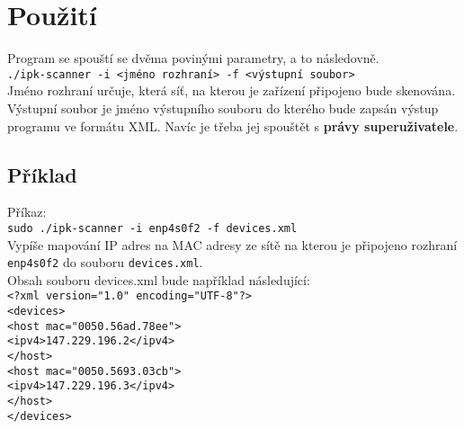 \documentclass[11pt,a4paper,titlepage]{article}
\begin{document}
\section{Použití}
Program se spouští se dvěma povinými parametry, a to následovně.\\
\texttt{./ipk-scanner -i <jméno rozhraní> -f <výstupní soubor>}\\
Jméno rozhraní určuje, která síť, na kterou je zařízení připojeno bude skenována.
Výstupní soubor je jméno výstupního souboru do kterého bude zapsán výstup programu
ve formátu XML.
Navíc je třeba jej spouštět s \textbf{právy superuživatele}.
\subsection{Příklad}
Příkaz: \\
\texttt{sudo ./ipk-scanner -i enp4s0f2 -f devices.xml}\\
Vypíše mapování IP adres na MAC adresy ze sítě na kterou je připojeno 
rozhraní \texttt{enp4s0f2} do souboru \texttt{devices.xml}.\\
Obsah souboru devices.xml bude například následující:\\
\texttt{<?xml version="1.0" encoding="UTF-8"?>}\\
\texttt{<devices>}\\
\texttt{<host mac="0050.56ad.78ee">}\\
\texttt{<ipv4>147.229.196.2</ipv4>}\\
\texttt{</host>}\\
\texttt{<host mac="0050.5693.03cb">}\\
\texttt{<ipv4>147.229.196.3</ipv4>}\\
\texttt{</host>}\\
\texttt{</devices>}\\


\end{document}
